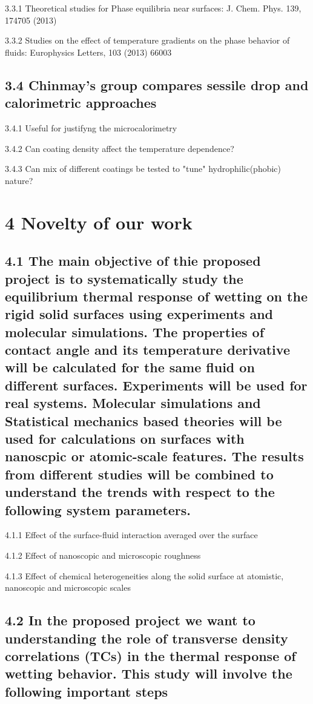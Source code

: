 \par 3.3.1 Theoretical studies for Phase equilibria near surfaces: J. Chem. Phys. 139, 174705 (2013)
\par 3.3.2 Studies on the effect of temperature gradients on the phase behavior of fluids: Europhysics Letters, 103 (2013) 66003\subsection{3.4 Chinmay's group compares sessile drop and calorimetric approaches}

\par 3.4.1 Useful for justifyng the microcalorimetry
\par 3.4.2 Can coating density affect the temperature dependence?
\par 3.4.3 Can mix of different coatings be tested to "tune" hydrophilic(phobic) nature?\section{4 Novelty of our work}
\subsection{4.1 The main objective of thie proposed project is to systematically study the equilibrium thermal response of wetting on the rigid solid surfaces using experiments and molecular simulations. The properties of contact angle and its temperature derivative will be calculated for the same fluid on different surfaces. Experiments will be used for real systems. Molecular simulations and Statistical mechanics based theories will be used for calculations on surfaces with nanoscpic or atomic-scale features. The results from different studies will be combined to understand the trends with respect to the following system parameters.}

\par 4.1.1 Effect of the surface-fluid interaction averaged over the surface
\par 4.1.2 Effect of nanoscopic and microscopic roughness
\par 4.1.3 Effect of chemical heterogeneities along the solid surface at atomistic, nanoscopic and microscopic scales\subsection{4.2 In the proposed project we want to understanding the role of transverse density correlations (TCs) in the thermal response of wetting behavior. This study will involve the following important steps}

